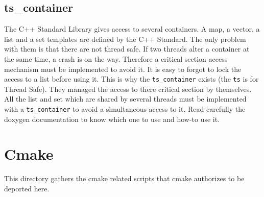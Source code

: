   \subsection{\textsf{ts\_container}}

  The C++ Standard Library gives access to several containers. A map, a vector, a
  list and a set templates are defined by the C++ Standard. The only problem with
  them is that there are not thread safe. If two threads alter a container at the
  same time, a crash is on the way. Therefore a critical section access mechanism
  must be implemented to avoid it. It is easy to forgot to lock the access to a
  list before using it. This is why the \texttt{ts\_container} exists (the
      \texttt{ts} is for Thread Safe). They managed the access to there critical
  section by themselves. All the list and set which are shared by several threads
  must be implemented with a \texttt{ts\_container} to avoid a simultaneous
  access to it. Read carefully the doxygen documentation to know which one to use
  and how-to use it.

\section{\textsf{Cmake}}
\label{s:Cmake}

This directory gathers the cmake related scripts that cmake authorizes to
be deported here.
